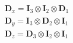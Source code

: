 \begin{subequations}
\begin{eqnarray}
     \mathbf{D}_x = \mathbf{I}_3 \otimes \mathbf{I}_2 \otimes\mathbf{D}_1 \\
     \mathbf{D}_y = \mathbf{I}_3 \otimes \mathbf{D}_2 \otimes\mathbf{I}_1 \\
     \mathbf{D}_z = \mathbf{D}_3 \otimes \mathbf{I}_2 \otimes\mathbf{I}_1
\end{eqnarray}
\end{subequations}
